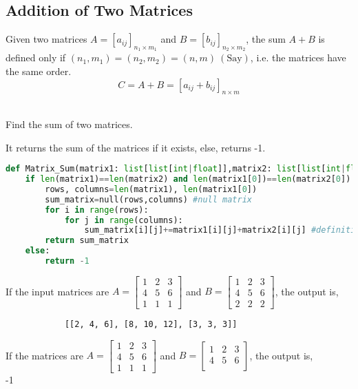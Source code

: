 \subsection{Addition of Two Matrices}
Given two matrices $A=[a_{ij}]_{n_1\times m_1}$ and $B=[b_{ij}]_{n_2\times m_2}$, the sum $A+B$ is defined only if $(n_1,m_1)=(n_2,m_2)=(n,m) \ (\text{Say})$, i.e. the matrices have the same order.
\[C=A+B=[a_{ij}+b_{ij}]_{n\times m}\]\
\begin{eg}
	Find the sum of two matrices.
\end{eg}
\begin{explanation}
	It returns the sum of the matrices if it exists, else, returns -1.\\
	\begin{lstlisting}[language=Python, numbers=none]
def Matrix_Sum(matrix1: list[list[int|float]],matrix2: list[list[int|float]]) -> list[list[int|float]] | int:
    if len(matrix1)==len(matrix2) and len(matrix1[0])==len(matrix2[0]): #Checking for compatibility for addition
        rows, columns=len(matrix1), len(matrix1[0])
        sum_matrix=null(rows,columns) #null matrix
        for i in range(rows):
            for j in range(columns):
                sum_matrix[i][j]+=matrix1[i][j]+matrix2[i][j] #definition of sum of matrices
        return sum_matrix
    else:
        return -1 \end{lstlisting}
	If the input matrices are $A=\begin{bmatrix}
			1 & 2 & 3 \\
			4 & 5 & 6 \\
			1 & 1 & 1
		\end{bmatrix}$ and $B=\begin{bmatrix}
			1 & 2 & 3 \\
			4 & 5 & 6 \\
			2 & 2 & 2
		\end{bmatrix}$, the output is,
	\begin{verbatim}
			[[2, 4, 6], [8, 10, 12], [3, 3, 3]]
		\end{verbatim}
	If the matrices are $A=\begin{bmatrix}
			1 & 2 & 3 \\
			4 & 5 & 6 \\
			1 & 1 & 1
		\end{bmatrix}$ and $B=\begin{bmatrix}
			1 & 2 & 3 \\
			4 & 5 & 6 \\
		\end{bmatrix}$, the output is,\\
	-1
\end{explanation}
